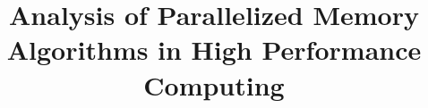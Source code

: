 \documentclass[journal, a4paper]{IEEEtran}
\begin{document}
	
	\title{Analysis of Parallelized Memory Algorithms in High Performance Computing}
	
	
	
	
	\maketitle
	
		
		
	
	
	
	
	
	
	
	
	\IEEEpeerreviewmaketitle
	
\end{document}

